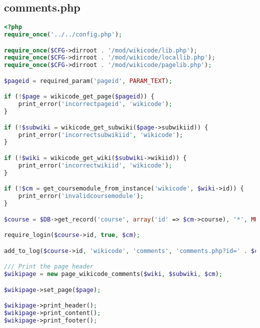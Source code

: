 \subsection{comments.php}
\begin{lstlisting}[language=PHP]
<?php
require_once('../../config.php');

require_once($CFG->dirroot . '/mod/wikicode/lib.php');
require_once($CFG->dirroot . '/mod/wikicode/locallib.php');
require_once($CFG->dirroot . '/mod/wikicode/pagelib.php');

$pageid = required_param('pageid', PARAM_TEXT);

if (!$page = wikicode_get_page($pageid)) {
    print_error('incorrectpageid', 'wikicode');
}

if (!$subwiki = wikicode_get_subwiki($page->subwikiid)) {
    print_error('incorrectsubwikiid', 'wikicode');
}

if (!$wiki = wikicode_get_wiki($subwiki->wikiid)) {
    print_error('incorrectwikiid', 'wikicode');
}

if (!$cm = get_coursemodule_from_instance('wikicode', $wiki->id)) {
    print_error('invalidcoursemodule');
}

$course = $DB->get_record('course', array('id' => $cm->course), '*', MUST_EXIST);

require_login($course->id, true, $cm);

add_to_log($course->id, 'wikicode', 'comments', 'comments.php?id=' . $cm->id, $wiki->id);

/// Print the page header
$wikipage = new page_wikicode_comments($wiki, $subwiki, $cm);

$wikipage->set_page($page);

$wikipage->print_header();
$wikipage->print_content();
$wikipage->print_footer();
\end{lstlisting}

